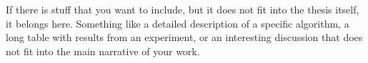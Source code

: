 If there is stuff that you want to include, but it does not fit into the thesis itself, it belongs here.
Something like a detailed description of a specific algorithm, a long table with results from an experiment, or an interesting discussion that does not fit into the main narrative of your work.

